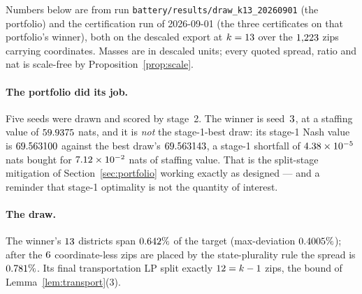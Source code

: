 \documentclass[11pt]{article}
\theoremstyle{definition}
\begin{document}
Numbers below are from run \texttt{battery/results/draw\_k13\_20260901} (the portfolio) and
the certification run of 2026-09-01 (the three certificates on that portfolio's winner),
both on the descaled export at $k=13$ over the $1{,}223$ zips carrying
coordinates. Masses are in descaled units; every quoted spread, ratio and nat is scale-free
by Proposition~\ref{prop:scale}.

\paragraph{The portfolio did its job.}
Five seeds were drawn and scored by stage~2. The winner is seed~$3$, at a
staffing value of $59.9375$ nats, and it is \emph{not} the stage-1-best draw: its
stage-1 Nash value is $69.563100$ against the best draw's $69.563143$, a stage-1 shortfall
of $4.38\times10^{-5}$ nats bought for $7.12\times10^{-2}$ nats of staffing value. That is the
split-stage mitigation of Section~\ref{sec:portfolio} working exactly as designed --- and a
reminder that stage-1 optimality is not the quantity of interest.

\paragraph{The draw.}
The winner's $13$ districts span $0.642\%$ of the target (max-deviation
$0.4005\%$); after the $6$ coordinate-less zips are placed by the
state-plurality rule the spread is $0.781\%$. Its final transportation LP split
exactly $12=k-1$ zips, the bound of Lemma~\ref{lem:transport}(3).
\end{document}
